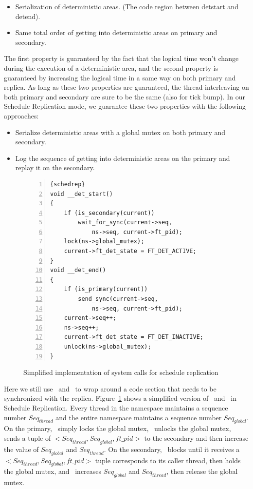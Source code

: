 \begin{itemize}
\item Serialization of deterministic areas. (The code region between detstart and detend).
\item Same total order of getting into deterministic areas on primary and secondary.
\end{itemize}

The first property is guaranteed by the fact that the logical time won't change during the execution of a deterministic area, and the second property is guaranteed by increasing the logical time in a same way on both primary and replica. As long as these two properties are guaranteed, the thread interleaving on both primary and secondary are sure to be the same (also for tick bump). In our Schedule Replication mode, we guarantee these two properties with the following approaches:

\begin{itemize}
\item Serialize deterministic areas with a global mutex on both primary and secondary.
\item Log the sequence of getting into deterministic areas on the primary and replay it on the secondary.
\end{itemize}

\begin{figure}
\begin{lstlisting}[numbers=left, frame=single, basicstyle=\small, breaklines]{schedrep}
void __det_start()
{
    if (is_secondary(current))
        wait_for_sync(current->seq, 
            ns->seq, current->ft_pid);
    lock(ns->global_mutex);
    current->ft_det_state = FT_DET_ACTIVE;
}
void __det_end()
{
    if (is_primary(current))
        send_sync(current->seq, 
            ns->seq, current->ft_pid);
    current->seq++;
    ns->seq++;
    current->ft_det_state = FT_DET_INACTIVE;
    unlock(ns->global_mutex);
}
\end{lstlisting}
\caption{Simplified implementation of system calls for schedule replication}
\label{f:schedrep_c}
\end{figure}

Here we still use \detstart\ and \detend\ to wrap around a code section that needs to be synchronized with the replica. Figure~\ref{f:schedrep_c} shows a simplified version of \detstart\ and \detend\ in Schedule Replication.  Every thread in the namespace maintains a sequence number $Seq_{thread}$ and the entire namespace maintains a sequence number $Seq_{global}$. On the primary, \detstart\ simply locks the global mutex, \detend\ unlocks the global mutex, sends a tuple of $< Seq_{thread}, Seq_{global}, ft\_pid >$ to the secondary and then increase the value of $Seq_{global}$ and $Seq_{thread}$. On the secondary, \detstart\ blocks until it receives a $< Seq_{thread}, Seq_{global}, ft\_pid >$ tuple corresponds to its caller thread, then holds the global mutex, and \detend\ increases $Seq_{global}$ and $Seq_{thread}$, then release the global mutex.


